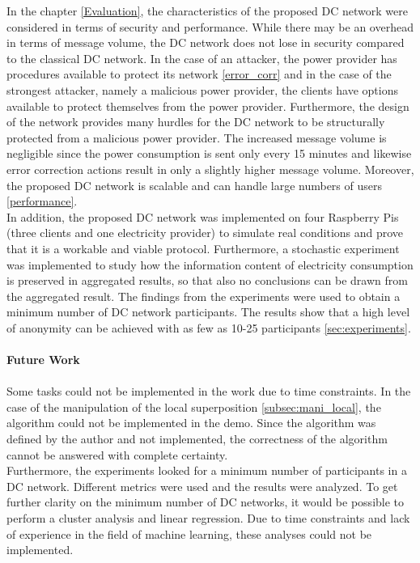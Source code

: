 In the chapter \ref{Evaluation}, the characteristics of the proposed DC network were considered in terms of security and performance. While there may be an overhead in terms of message volume, the DC network does not lose in security compared to the classical DC network. In the case of an attacker, the power provider has procedures available to protect its network \ref{error_corr} and in the case of the strongest attacker, namely a malicious power provider, the clients have options available to protect themselves from the power provider. Furthermore, the design of the network provides many hurdles for the DC network to be structurally protected from a malicious power provider. The increased message volume is negligible since the power consumption is sent only every 15 minutes and likewise error correction actions result in only a slightly higher message volume. Moreover, the proposed DC network is scalable and can handle large numbers of users \ref{performance}.\\
In addition, the proposed DC network was implemented on four Raspberry Pis (three clients and one electricity provider) to simulate real conditions and prove that it is a workable and viable protocol. Furthermore, a stochastic experiment was implemented to study how the information content of electricity consumption is preserved in aggregated results, so that also no conclusions can be drawn from the aggregated result. The findings from the experiments were used to obtain a minimum number of DC network participants. The results show that a high level of anonymity can be achieved with as few as 10-25 participants \ref{sec:experiments}. \\
\\
\textbf{Future Work}
\\
\\
Some tasks could not be implemented in the work due to time constraints. In the case of the manipulation of the local superposition \ref{subsec:mani_local}, the algorithm could not be implemented in the demo. Since the algorithm was defined by the author and not implemented, the correctness of the algorithm cannot be answered with complete certainty. \\
Furthermore, the experiments looked for a minimum number of participants in a DC network. Different metrics were used and the results were analyzed. To get further clarity on the minimum number of DC networks, it would be possible to perform a cluster analysis and linear regression. Due to time constraints and lack of experience in the field of machine learning, these analyses could not be implemented.





\cleardoublepage

